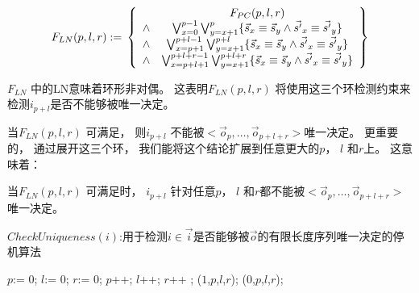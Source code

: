 \begin{equation}\label{uniqln}
F_{LN}(p,l,r):=\\
\left\{
\begin{array}{cc}
&F_{PC}(p,l,r)\\
\wedge&\bigvee_{x=0}^{p-1}\bigvee_{y=x+1}^{p} \{\vec{s}_x\equiv \vec{s}_y\wedge \vec{s'}_x\equiv \vec{s'}_y\} \\
\wedge&\bigvee_{x=p+1}^{p+l-1}\bigvee_{y=x+1}^{p+l} \{\vec{s}_x\equiv \vec{s}_y\wedge \vec{s'}_x\equiv \vec{s'}_y\} \\
\wedge&\bigvee_{x=p+l+1}^{p+l+r-1}\bigvee_{y=x+1}^{p+l+r} \{\vec{s}_x\equiv \vec{s}_y\wedge \vec{s'}_x\equiv \vec{s'}_y\}
\end{array}
\right\}
\end{equation}

$F_{LN}$ 中的LN意味着环形非对偶。
这表明$F_{LN}(p,l,r)$ 将使用这三个环检测约束来检测$i_{p+l}$是否不能够被唯一决定。

当$F_{LN}(p,l,r)$ 可满足，
则$i_{p+l}$ 不能被$<\vec{o}_{p},\dots,\vec{o}_{p+l+r}>$唯一决定。
更重要的，
通过展开这三个环，
我们能将这个结论扩展到任意更大的$p$， $l$ 和$r$上。
这意味着：

\begin{proposition}\label{prop_ln1}
当$F_{LN}(p,l,r)$ 可满足时，
$i_{p+l}$ 针对任意$p$， $l$ 和$r$都不能被$<\vec{o}_{p},\dots,\vec{o}_{p+l+r}>$ 唯一决定。
\end{proposition}



\begin{algorithm}[t]
\caption{$CheckUniqueness(i)$:用于检测$i\in\vec{i}$是否能够被$\vec{o}$的有限长度序列唯一决定的停机算法}
\label{alg_pcln_chap1}
\begin{algorithmic}[1]
\STATE $p$:= 0;
\STATE $l$:= 0;
\STATE $r$:= 0;
\STATE $p$++;
\STATE $l$++;
\STATE $r$++ ;
\label{linepc1}
\RETURN ($1$,$p$,$l$,$r$)\label{lineln1};
\label{lnsat}
\RETURN ($0$,$p$,$l$,$r$);
\ENDIF
\ENDWHILE
\end{algorithmic}
\end{algorithm}

%




